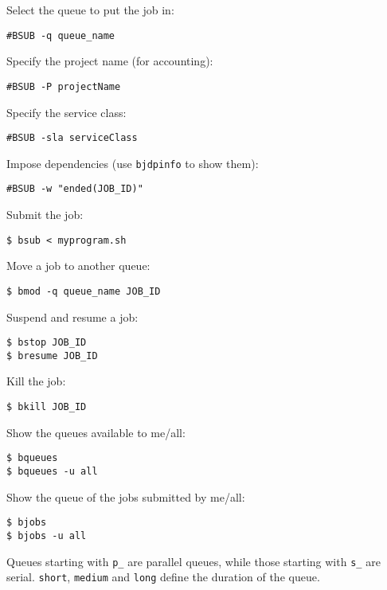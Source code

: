 \documentclass[twocolumn,8pt]{article}
\begin{document}
\begin{mdframed}[frametitle=\#BSUB directives]
Select the queue to put the job in:
\begin{lstlisting}
#BSUB -q queue_name
\end{lstlisting}

Specify the project name (for accounting):
\begin{lstlisting}
#BSUB -P projectName
\end{lstlisting}

Specify the service class:
\begin{lstlisting}
#BSUB -sla serviceClass
\end{lstlisting}

Impose dependencies (use \texttt{bjdpinfo} to show them):
\begin{lstlisting}
#BSUB -w "ended(JOB_ID)"
\end{lstlisting}

\end{mdframed}


\begin{mdframed}[frametitle=Submitting/Moving/Killing the job]
Submit the job:
\begin{lstlisting}
$ bsub < myprogram.sh
\end{lstlisting}

Move a job to another queue:
\begin{lstlisting}
$ bmod -q queue_name JOB_ID
\end{lstlisting}

Suspend and resume a job:
\begin{lstlisting}
$ bstop JOB_ID				
$ bresume JOB_ID
\end{lstlisting}

Kill the job:
\begin{lstlisting}
$ bkill JOB_ID
\end{lstlisting}
\end{mdframed}


\begin{mdframed}[frametitle=Queues]
Show the queues available to me/all:
\begin{lstlisting}
$ bqueues
$ bqueues -u all
\end{lstlisting}

Show the queue of the jobs submitted by me/all:
\begin{lstlisting}
$ bjobs
$ bjobs -u all
\end{lstlisting}

Queues starting with \texttt{p\_} are parallel queues, while those starting with \texttt{s\_} are serial. \texttt{short}, \texttt{medium} and \texttt{long} define the duration of the queue.
\end{mdframed}
\end{document}
